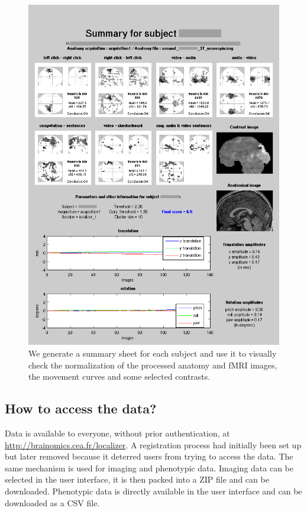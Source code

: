\documentclass[review]{elsarticle}
\begin{document}
\begin{figure}[h!]
    \centering
    \includegraphics[scale=0.25]{summary}
    \caption{We generate a summary sheet for each subject and use it to
    visually check the normalization of the processed anatomy and fMRI
    images, the movement curves and some selected contrasts.}
    \label{fig:summary}
\end{figure}


\subsection{How to access the data?}

Data is available to everyone, without prior authentication, at
\url{http://brainomics.cea.fr/localizer}. A registration process
had initially been set up but later removed because it deterred
users from trying to access the data. The same mechanism is used
for imaging and phenotypic data. Imaging data can be selected in the
user interface, it is then packed into a ZIP file and can be downloaded.
Phenotypic data is directly available in the user interface and can be
downloaded as a CSV file.
\end{document}
